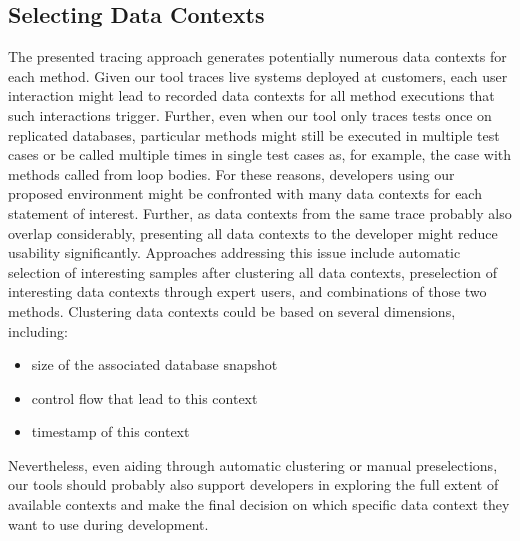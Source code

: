 \subsection{Selecting Data Contexts}
The presented tracing approach generates potentially numerous data contexts for each method.
Given our tool traces live systems deployed at customers, each user interaction might lead to recorded data contexts for all method executions that such interactions trigger.
Further, even when our tool only traces tests once on replicated databases, particular methods might still be executed in multiple test cases or be called multiple times in single test cases as, for example, the case with methods called from loop bodies.
For these reasons, developers using our proposed environment might be confronted with many data contexts for each statement of interest.
Further, as data contexts from the same trace probably also overlap considerably, presenting all data contexts to the developer might reduce usability significantly.
Approaches addressing this issue include automatic selection of interesting samples after clustering all data contexts, preselection of interesting data contexts through expert users, and combinations of those two methods.
Clustering data contexts could be based on several dimensions, including:
\begin{itemize}
  \item size of the associated database snapshot
  \item control flow that lead to this context
  \item timestamp of this context
\end{itemize}
Nevertheless, even aiding through automatic clustering or manual preselections, our tools should probably also support developers in exploring the full extent of available contexts and make the final decision on which specific data context they want to use during development.
